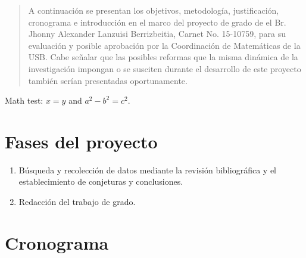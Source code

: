 \documentclass[12pt]{article}
\begin{document}
    \maketitle
    \thispagestyle{empty}

    \begin{abstract}
        A continuación se presentan los objetivos, metodología, justificación,
        cronograma e introducción en el marco del proyecto de grado de el
        Br. Jhonny Alexander Lanzuisi Berrizbeitia, Carnet No. 15-10759, para su
        evaluación y posible aprobación por la Coordinación de Matemáticas de
        la USB. Cabe señalar que las posibles reformas que la misma dinámica
        de la investigación impongan o se susciten durante el desarrollo de
        este proyecto también serían presentadas oportunamente.
    \end{abstract}

    Math test: $ x = y $ and $ a^2 - b^2 = c^2 $.

    \section{Fases del proyecto}

    \begin{enumerate}[label=\Roman*.]
        \item Búsqueda y recolección de datos mediante la revisión
              bibliográfica y el establecimiento de conjeturas y conclusiones.
        \item Redacción del trabajo de grado.
    \end{enumerate}

    \section{Cronograma}
\end{document}
